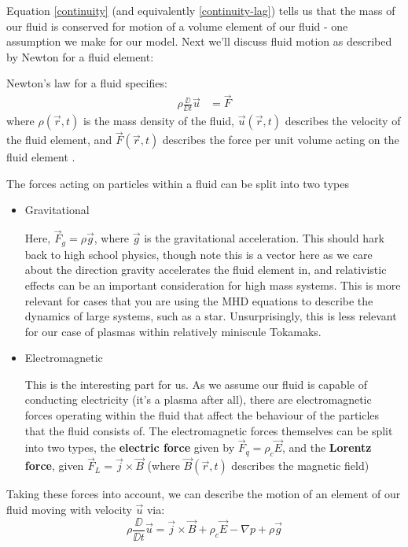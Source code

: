 Equation \eqref{continuity} (and equivalently \eqref{continuity-lag}) tells us that the mass of our fluid is conserved for motion of a volume element 
of our fluid - one assumption we make for our model. Next we'll discuss fluid motion as described by Newton for a fluid element:

\begin{definition}
    Newton's law for a fluid specifies:
    \begin{align}
        \rho \frac{\DD }{\DD t} \vec{u} &= \vec{F}
    \end{align}
    where $\rho(\vec{r}, t)$ is the mass density of the fluid, 
    $\vec{u}(\vec{r}, t)$ describes the velocity of the fluid element, and $\vec{F}(\vec{r}, t)$ 
    describes the force per unit volume acting on the fluid element \cite{mhd-lectures}.
\end{definition}
The forces acting on particles within a fluid can be split into two types
\begin{itemize}
    \item Gravitational
    
    Here, $\vec{F}_g = \rho \vec{g}$, where $\vec{g}$ is the gravitational acceleration. This should hark back to high school 
    physics, though note this is a vector here as we care about the direction gravity accelerates the fluid element in, 
    and relativistic effects can be an important consideration for high mass systems. This is more relevant for cases that 
    you are using the MHD equations to describe the dynamics of large systems, such as a star. Unsurprisingly, this is less relevant 
    for our case of plasmas within relatively miniscule Tokamaks.

    \item Electromagnetic
    
    This is the interesting part for us. As we assume our fluid is capable of conducting electricity (it's a plasma after all),
    there are electromagnetic forces operating within the fluid that affect the behaviour of the particles that the fluid consists of. 
    The electromagnetic forces themselves can be split into two types, the \textbf{electric force} given by $\vec{F}_q = \rho_c \vec{E}$, 
    and the \textbf{Lorentz force}, given $\vec{F}_{L} = \vec{j} \times \vec{B}$ (where $\vec{B}(\vec{r}, t)$ describes the magnetic field)
\end{itemize}
Taking these forces into account, we can describe the motion of an element of our fluid moving with velocity $\vec{u}$ 
via:
\begin{equation}
    \rho \frac{\DD}{\DD t} \vec{u} =  \vec{j} \times \vec{B} + \rho_c \vec{E} - \nabla p + \rho \vec{g}
\end{equation}


